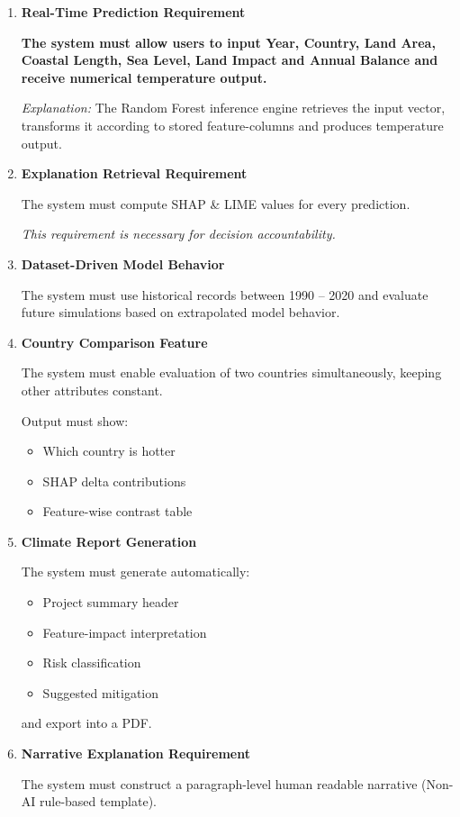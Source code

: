 \documentclass[12pt, a4paper]{article}
\begin{document}
\begin{enumerate}
\item \textbf{Real-Time Prediction Requirement}

\textbf{The system must allow users to input Year, Country, Land Area, Coastal Length, Sea Level, Land Impact and Annual Balance and receive numerical temperature output.}

\vspace{0.3cm}
\textit{Explanation:}  
The Random Forest inference engine retrieves the input vector, transforms it according to stored feature-columns and produces temperature output.

\item \textbf{Explanation Retrieval Requirement}

The system must compute SHAP & LIME values for every prediction.

\textit{This requirement is necessary for decision accountability.}

\item \textbf{Dataset-Driven Model Behavior}

The system must use historical records between 1990 – 2020 and evaluate future simulations based on extrapolated model behavior.

\item \textbf{Country Comparison Feature}

The system must enable evaluation of two countries simultaneously, keeping other attributes constant.

Output must show:
\begin{itemize}
\item Which country is hotter
\item SHAP delta contributions
\item Feature-wise contrast table
\end{itemize}

\item \textbf{Climate Report Generation}

The system must generate automatically:

\begin{itemize}
\item Project summary header  
\item Feature-impact interpretation  
\item Risk classification  
\item Suggested mitigation  
\end{itemize}

and export into a PDF.

\item \textbf{Narrative Explanation Requirement}

The system must construct a paragraph-level human readable narrative (Non-AI rule-based template).

\end{enumerate}
\end{document}
